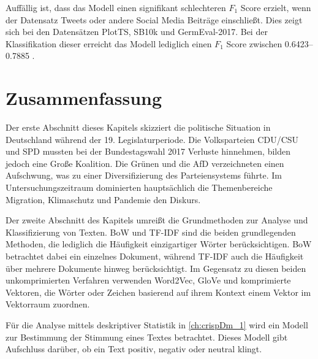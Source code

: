 Auffällig ist, dass das Modell einen signifikant schlechteren $F_1$ Score erzielt, wenn der Datensatz Tweets oder andere Social Media Beiträge einschließt. Dies zeigt sich bei den Datensätzen PlotTS, SB10k und GermEval-2017. Bei der Klassifikation dieser erreicht das Modell lediglich einen $F_1$ Score zwischen \numrange{0.6423}{0.7885} \autocite[1631]{guhr_training_2020}.

\section{Zusammenfassung}

Der erste Abschnitt dieses Kapitels skizziert die politische Situation in Deutschland während der \num{19}. Legislaturperiode. Die Volksparteien \ac{CDU}/\ac{CSU} und \ac{SPD} mussten bei der Bundestagswahl \num{2017} Verluste hinnehmen, bilden jedoch eine Große Koalition. Die Grünen und die \ac{AfD} verzeichneten einen Aufschwung, was zu einer Diversifizierung des Parteiensystems führte. Im Untersuchungszeitraum dominierten hauptsächlich die Themenbereiche Migration, Klimaschutz und Pandemie den Diskurs.

Der zweite Abschnitt des Kapitels umreißt die Grundmethoden zur Analyse und Klassifizierung von Texten. \ac{BoW} und \ac{TF-IDF} sind die beiden grundlegenden Methoden, die lediglich die Häufigkeit einzigartiger Wörter berücksichtigen. \ac{BoW} betrachtet dabei ein einzelnes Dokument, während \ac{TF-IDF} auch die Häufigkeit über mehrere Dokumente hinweg berücksichtigt. Im Gegensatz zu diesen beiden unkomprimierten Verfahren verwenden Word2Vec, GloVe und \ft komprimierte Vektoren, die Wörter oder Zeichen basierend auf ihrem Kontext einem Vektor im Vektorraum zuordnen.

Für die Analyse mittels deskriptiver Statistik in \autoref{ch:crispDm_1} wird ein Modell zur Bestimmung der Stimmung eines Textes betrachtet. Dieses Modell gibt Aufschluss darüber, ob ein Text positiv, negativ oder neutral klingt.
